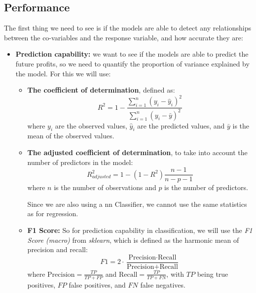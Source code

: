 \documentclass[11pt,english,a4paper,hidelinks]{book}
\begin{document}
\subsection{Performance}
The first thing we need to see is if the models are able to detect any relationships between the co-variables and the response variable, and how accurate they are:
\begin{itemize}
    \item \textbf{Prediction capability:} we want to see if the models are able to predict the future profits, so we need to quantify the proportion of variance explained by the model. For this we will use:
    \begin{itemize}
        \item  \textbf{The coefficient of determination}, defined as:
        \begin{equation}
            R^2 = 1 - \frac{\sum_{i=1}^{n} {(y_i - \hat{y}_i)}^2}{\sum_{i=1}^{n} {(y_i - \bar{y})}^2}
        \end{equation}
        where \(y_i\) are the observed values, \(\hat{y}_i\) are the predicted values, and \(\bar{y}\) is the mean of the observed values.
        \item \textbf{The adjusted coefficient of determination}, to take into account the number of predictors in the model:
        \begin{equation}
            R^2_{adjusted} = 1 - \left(1 - R^2\right) \frac{n - 1}{n - p - 1}
        \end{equation}
        where \(n\) is the number of observations and \(p\) is the number of predictors.
        \par\medskip
        Since we are also using a \acrshort{nn} Classifier, we cannot use the same statistics as for regression.
        \item \textbf{F1 Score:}  So for prediction capability in classification, we will use the \textit{F1 Score (macro)} from \textit{sklearn}, which is defined as the harmonic mean of precision and recall:
        \begin{equation}
            F1 = 2 \cdot \frac{\text{Precision} \cdot \text{Recall}}{\text{Precision} + \text{Recall}}
        \end{equation}
        where \(\text{Precision} = \frac{TP}{TP + FP}\) and \(\text{Recall} = \frac{TP}{TP + FN}\), with \(TP\) being true positives, \(FP\) false positives, and \(FN\) false negatives.


\end{itemize}
\end{itemize}
\end{document}
